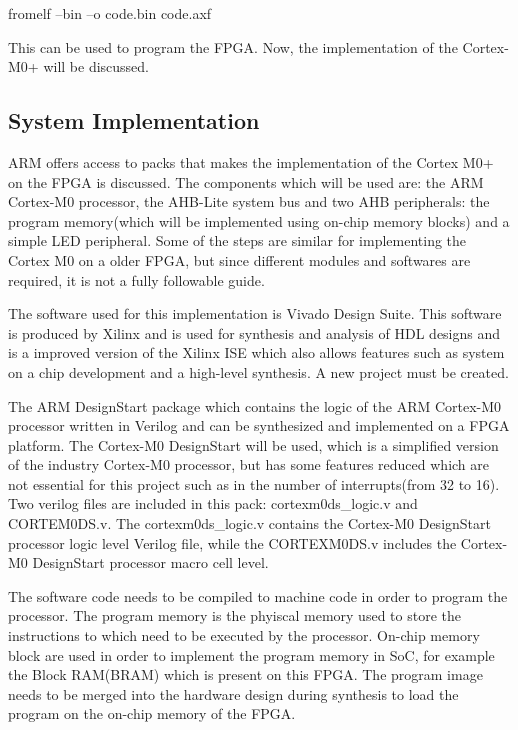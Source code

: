 fromelf --bin --o code.bin code.axf

This can be used to program the FPGA. Now, the implementation of the Cortex-M0+ will be discussed.

\subsection{System Implementation}

ARM offers access to packs that makes the implementation of the Cortex M0+ on the FPGA is discussed. The components which will be used are: the ARM Cortex-M0 processor, the AHB-Lite system bus and two AHB peripherals: the program memory(which will be implemented using on-chip memory blocks) and a simple LED peripheral. Some of the steps are similar for implementing the Cortex M0 on a older FPGA, but since different modules and softwares are required, it is not a fully followable guide.

The software used for this implementation is Vivado Design Suite. This software is produced by Xilinx and is used for synthesis and analysis of HDL designs and is a improved version of the Xilinx ISE which also allows features such as system on a chip development and a high-level synthesis. A new project must be created.

The ARM DesignStart  package which contains the logic of the ARM Cortex-M0 processor written in Verilog and can be synthesized and implemented on a FPGA platform. The Cortex-M0 DesignStart will be used, which is a simplified version of the industry Cortex-M0 processor, but has some features reduced which are not essential for this project such as in the number of interrupts(from 32 to 16). Two verilog files are included in this pack:  cortexm0ds\_logic.v and CORTEM0DS.v. The cortexm0ds\_logic.v contains the Cortex-M0 DesignStart processor logic level Verilog file, while the CORTEXM0DS.v includes the Cortex-M0 DesignStart processor macro cell level.

The software code needs to be compiled to machine code in order to program the processor. The program memory is the phyiscal memory used to store the instructions to which need to be executed by the processor. On-chip memory block are used in order to implement the program memory in SoC, for example the Block RAM(BRAM) which is present on this FPGA. The program image needs to be merged into the hardware design during synthesis to load the program on the on-chip memory of the FPGA.

